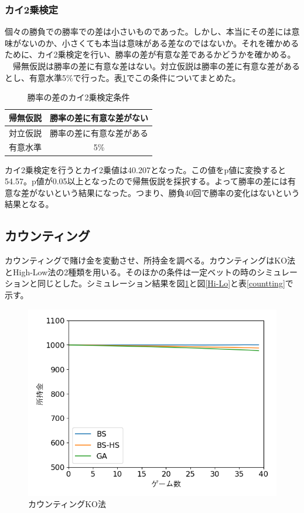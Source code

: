\subsubsection{カイ2乗検定}
個々の勝負での勝率での差は小さいものであった。しかし、本当にその差には意味がないのか、小さくても本当は意味がある差なのではないか。それを確かめるために、カイ2乗検定を行い、勝率の差が有意な差であるかどうかを確かめる。
　帰無仮説は勝率の差に有意な差はない。対立仮説は勝率の差に有意な差があるとし、有意水準5\%で行った。表\ref{win-x}でこの条件についてまとめた。
\begin{table}[H]
 \caption{勝率の差のカイ2乗検定条件\label{win-x}}
 \begin{center}
  \begin{tabular}{|c|c|}
  \hline 帰無仮説 & 勝率の差に有意な差がない \\
  \hline 対立仮説 & 勝率の差に有意な差がある \\
  \hline 有意水準 & 5\% \\
  \hline
  \end{tabular}
 \end{center}
\end{table}
カイ2乗検定を行うとカイ2乗値は40.207となった。この値をp値に変換すると54.57。p値が0.05以上となったので帰無仮説を採択する。よって勝率の差には有意な差がないという結果になった。つまり、勝負40回で勝率の変化はないという結果となる。

\subsection{カウンティング}
カウンティングで賭け金を変動させ、所持金を調べる。カウンティングはKO法とHigh-Low法の2種類を用いる。そのほかの条件は一定ベットの時のシミュレーションと同じとした。シミュレーション結果を図\ref{KO}と図\ref{Hi-Lo}と表\ref{countting}で示す。
\begin{figure}[H]
 \begin{center} 
  \includegraphics[width=0.7\linewidth]{./figure/KO}
  \caption{カウンティングKO法\label{KO}}
 \end{center}
\end{figure}

